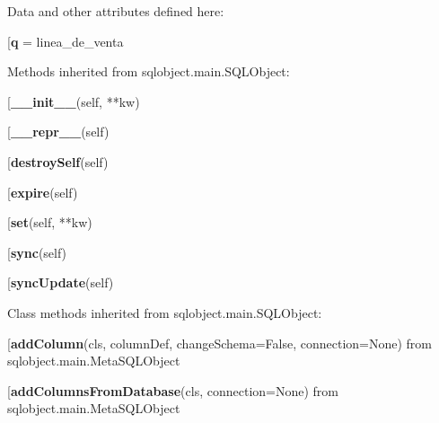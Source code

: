 Data and other attributes defined here:\\
\begin{description}\item[{\bf q} = linea\_de\_venta\end{description}


Methods inherited from sqlobject.main.SQLObject:\\
\begin{description}\item[{\bf \_\_init\_\_}(self, **kw)\end{description}

\begin{description}\item[{\bf \_\_repr\_\_}(self)\end{description}

\begin{description}\item[{\bf destroySelf}(self)\end{description}

\begin{description}\item[{\bf expire}(self)\end{description}

\begin{description}\item[{\bf set}(self, **kw)\end{description}

\begin{description}\item[{\bf sync}(self)\end{description}

\begin{description}\item[{\bf syncUpdate}(self)\end{description}


Class methods inherited from sqlobject.main.SQLObject:\\
\begin{description}\item[{\bf addColumn}(cls, columnDef, changeSchema=False, connection=None) from sqlobject.main.MetaSQLObject\end{description}

\begin{description}\item[{\bf addColumnsFromDatabase}(cls, connection=None) from sqlobject.main.MetaSQLObject\end{description}

